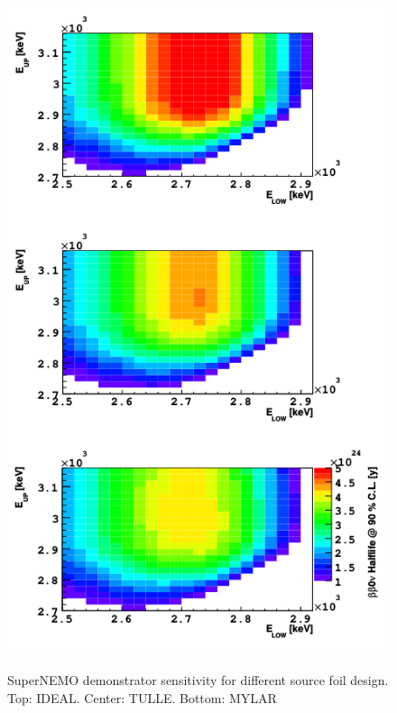 \documentclass[main.tex]{subfiles}
\begin{document}
\begin{figure}[h!]
\centering
\includegraphics[scale=0.7]{pictures/Chap4/Sens2D-3designs.png}
\label{Sens2D-3designs.png}
\caption{SuperNEMO demonstrator sensitivity for different source foil design. Top: IDEAL. Center: TULLE. Bottom: MYLAR}
\end{figure}
\end{document}
